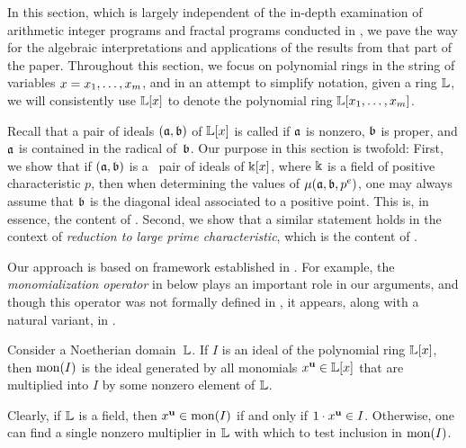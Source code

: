 \documentclass{article}
\begin{document}
In this section, which is largely independent of the in-depth examination of arithmetic integer programs and fractal programs conducted in , we pave the way for the algebraic interpretations and applications of the results from that part of the paper. 
Throughout this section, we focus on polynomial rings in the string of variables $x = x_1, \ldots, x_m$, and in an attempt to simplify notation,  given a ring $\mathbb{L}$, we will {consistently} use $\mathbb{L}[x]$ to denote the polynomial ring $\mathbb{L}[x_1, \ldots, x_m]$.

Recall that a pair of ideals $(\mathfrak{a}, \mathfrak{b})$ of $\mathbb{L}[x]$ is called \emph{\compatible} if $\mathfrak{a}$ is nonzero, $\mathfrak{b}$ is proper, and $\mathfrak{a}$ is contained in the radical of~$\mathfrak{b}$.  
Our purpose in this section is twofold:  First, we show that if $(\mathfrak{a}, \mathfrak{b})$ is a \compatible\ pair of ideals of $\Bbbk[x]$, where $\Bbbk$ is a field of positive characteristic $p$, then when determining the values of $\mu(\mathfrak{a}, \mathfrak{b}, p^e)$, one may always assume that $\mathfrak{b}$ is the diagonal ideal associated to a positive point.   This is, in essence, the content of .  Second, we show that a similar statement holds in the context of \emph{reduction to large prime characteristic}, which is the content of .

Our approach is based on framework established in \cite[Appendix]{budur+mustata+saito.roots_bs_polys_monomial}.  For example, the \emph{monomialization operator} in  below plays an important role in our arguments, and though this operator was not formally defined in \loccit, it appears, along with a natural variant, in \cite[Proposition 6.1 and Lemma 6.2]{budur+mustata+saito.roots_bs_polys_monomial}. 

\begin{definition}
\label{monomialization: D}
Consider a Noetherian domain~$\mathbb{L}$.  If $I$ is an ideal of the polynomial ring $\mathbb{L}[x]$, then $\operatorname{mon}(I)$ is the ideal generated by all monomials $x^{\mathbf{u}} \in \mathbb{L}[x]$ that are multiplied into $I$ by some nonzero element of $\mathbb{L}$.
\end{definition}

Clearly, if $\mathbb{L}$ is a field, then $x^{\mathbf{u}} \in \operatorname{mon}(I)$ if and only if $1\cdot x^{\mathbf{u}} \in I$.
Otherwise, one can find a single nonzero multiplier in $\mathbb{L}$ with which to test inclusion in $\operatorname{mon}(I)$.  
\end{document}
